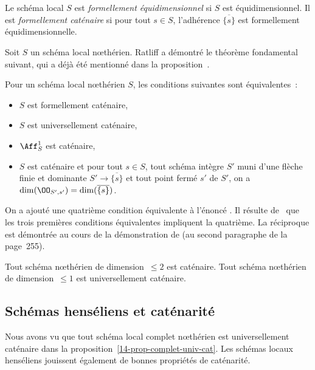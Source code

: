 \documentclass[10pt]{../fichiers-configuration-latex/smfart}
\begin{document}
\begin{definition2} \label{14-defi-formellement-catenaire} Le schéma local $S$ est
\emph{formellement équidimensionnel} si  $\widehat{S}$ est équidimensionnel. Il est
\emph{formellement caténaire} si pour tout $s\in S$, l'adhérence $\overline{\{s\}}$ est formellement
équidimensionnelle.  \end{definition2}

Soit $S$ un schéma local nœthérien. Ratliff a démontré le théorème fondamental suivant, qui a déjà
été mentionné dans la proposition~.

\begin{theoreme2} \label{14-theoreme-Ratliff} Pour un schéma local
nœthérien $S$, les conditions suivantes sont équivalentes~: \begin{itemize} \item $S$ est
formellement caténaire, \item $S$ est universellement caténaire, \item $\Aff^1_S$ est caténaire,
\item $S$ est caténaire et pour tout $s \in S$, tout schéma intègre $S'$ muni d'une flèche finie et
dominante $S'\rightarrow \overline{\{s\}}$ et tout point fermé $s'$ de $S'$, on a $\dim(\OO_{S',s'})
= \dim(\overline{\{s\}})$.  \end{itemize} \end{theoreme2}

On a ajouté une quatrième condition équivalente à l'énoncé \cite[Theorem~31.7]{CRT@Matsumura}. Il
résulte de~ que les trois premières conditions équivalentes impliquent la
quatrième. La réciproque est démontrée au cours de la démonstration de
\cite[Theorem~31.7]{CRT@Matsumura} (au second paragraphe de la page~255).


\begin{corollaire2} \label{14-corollaire-dim2-cat} Tout schéma nœthérien
de dimension~$\leq 2$ est caténaire. Tout schéma nœthérien de dimension~$\leq 1$ est universellement
caténaire.  \end{corollaire2}

\subsection{Schémas henséliens et caténarité}

Nous avons vu  que tout schéma local complet nœthérien est universellement caténaire dans la
proposition~\ref{14-prop-complet-univ-cat}. Les schémas locaux henséliens  jouissent également de
bonnes propriétés de caténarité.
\end{document}
